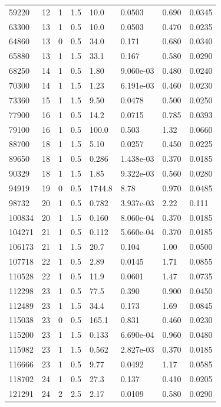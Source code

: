 \documentclass[preview]{standalone}
\begin{document}
{{\begin{tabular}{L{1.2cm}C{1.2cm} C{0.3cm}C{0.5cm} C{1.4cm}C{1.4cm} C{1.4cm}C{1.4cm}}
  59220  &    12  & 1     & 1.5 &  10.0  & 0.0503  & 0.690 &  0.0345   \\ 
  63300  &    13  & 1     & 0.5 &  10.0  & 0.0503  & 0.470 &  0.0235   \\ 
  64860  &    13  & 0     & 0.5 &  34.0  & 0.171  & 0.680 &  0.0340   \\ 
  65880  &    13  & 1     & 1.5 &  33.1  & 0.167  & 0.580 &  0.0290   \\ 
  68250  &    14  & 1     & 0.5 &  1.80  & 9.060e-03  & 0.480 &  0.0240   \\ 
  70300  &    14  & 1     & 1.5 &  1.23  & 6.191e-03  & 0.460 &  0.0230   \\ 
  73360  &    15  & 1     & 1.5 &  9.50  & 0.0478  & 0.500 &  0.0250   \\ 
  77900  &    16  & 1     & 0.5 &  14.2  & 0.0715  & 0.785 &  0.0393   \\ 
  79100  &    16  & 1     & 0.5 &  100.0  & 0.503  & 1.32 &  0.0660   \\ 
  88700  &    18  & 1     & 1.5 &  5.10  & 0.0257  & 0.450 &  0.0225   \\ 
  89650  &    18  & 1     & 0.5 &  0.286  & 1.438e-03  & 0.370 &  0.0185   \\ 
  90329  &    18  & 1     & 1.5 &  1.85  & 9.322e-03  & 0.560 &  0.0280   \\ 
  94919  &    19  & 0     & 0.5 &  1744.8  & 8.78  & 0.970 &  0.0485   \\ 
  98732  &    20  & 1     & 0.5 &  0.782  & 3.937e-03  & 2.22 &  0.111   \\ 
  100834  &    20  & 1     & 1.5 &  0.160  & 8.060e-04  & 0.370 &  0.0185   \\ 
  104271  &    21  & 1     & 0.5 &  0.112  & 5.660e-04  & 0.370 &  0.0185   \\ 
  106173  &    21  & 1     & 1.5 &  20.7  & 0.104  & 1.00 &  0.0500   \\ 
  107718  &    22  & 1     & 0.5 &  2.89  & 0.0145  & 1.71 &  0.0855   \\ 
  110528  &    22  & 1     & 0.5 &  11.9  & 0.0601  & 1.47 &  0.0735   \\ 
  112298  &    23  & 1     & 0.5 &  77.5  & 0.390  & 0.900 &  0.0450   \\ 
  112489  &    23  & 1     & 1.5 &  34.4  & 0.173  & 1.69 &  0.0845   \\ 
  115038  &    23  & 0     & 0.5 &  165.1  & 0.831  & 0.460 &  0.0230   \\ 
  115200  &    23  & 1     & 1.5 &  0.133  & 6.690e-04  & 0.960 &  0.0480   \\ 
  115982  &    23  & 1     & 1.5 &  0.562  & 2.827e-03  & 0.370 &  0.0185   \\ 
  116666  &    23  & 1     & 0.5 &  9.77  & 0.0492  & 1.17 &  0.0585   \\ 
  118702  &    24  & 1     & 0.5 &  27.3  & 0.137  & 0.410 &  0.0205   \\ 
  121291  &    24  & 2     & 2.5 &  2.17  & 0.0109  & 0.580 &  0.0290   \\ 
\hline 
\end{tabular} 

}}
\end{document}
